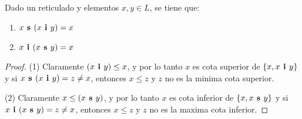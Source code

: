 \begin{lemma}
  Dado un reticulado \reticul y elementos $x, y \in L$, se tiene que:
  \begin{enumerate}
    \item $x\textbf{ s }(x\textbf{ i }y) = x$
    \item $x\textbf{ i }(x\textbf{ s }y) = x$
  \end{enumerate}
\end{lemma}
\begin{proof}
  (1) Claramente $(x\textbf{ i }y) \leq x$, y por lo tanto $x$ es cota superior de $\{x, x\textbf{ i }y\}$ y si $x\textbf{ s }(x\textbf{ i }y)=z\neq x$, entonces $x\leq z$ y $z$ no es la minima cota superior.

  (2) Claramente $x \leq (x\textbf{ s }y)$, y por lo tanto $x$ es cota inferior de $\{x, x\textbf{ s }y\}$ y si $x\textbf{ i }(x\textbf{ s }y)=z\neq x$, entonces $x\leq z$ y $z$ no es la maxima cota inferior.
\end{proof}

